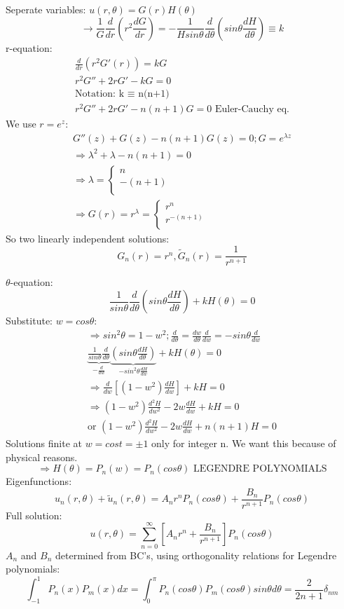 \documentclass[10pt,a4paper]{article}
\begin{document}
\begin{multicols}{2}
Seperate variables: $u(r,\theta)=G(r)H(\theta)$
\[\rightarrow \frac{1}{G}\frac{d}{dr}\left(r^{2}\frac{dG}{dr}\right)=-\frac{1}{Hsin\theta}\frac{d}{d\theta}\left(sin\theta\frac{dH}{d\theta}\right) \equiv k \]
r-equation:
\begin{align*}
    \frac{d}{dr}\left(r^{2}G'(r)\right)=kG \\
    r^{2}G'' + 2rG' -kG = 0 \\
    \text{Notation: k $\equiv$ n(n+1)} \\
    r^{2}G'' + 2rG' - n(n+1)G=0 \text{ Euler-Cauchy eq.}
\end{align*}
We use $r=e^{z}$:
\begin{align*}
    G''(z) + G(z) - n(n+1)G(z) = 0; G=e^{\lambda z}\\
    \Rightarrow \lambda^{2} + \lambda - n(n+1)=0 \\
    \Rightarrow \lambda=
    \begin{cases}
           n \\
           -(n+1) \\
    \end{cases} \\
    \Rightarrow G(r) = r^{\lambda} = 
    \begin{cases}
           r^{n} \\
           r^{-(n+1)}\\
    \end{cases}
\end{align*}
So two linearly independent solutions: 
\[G_{n}(r)=r^{n}, \widetilde G_{n}(r) = \frac{1}{r^{n+1}}\]

$\theta$-equation:
\[\frac{1}{sin\theta}\frac{d}{d\theta}\left(sin\theta\frac{dH}{d\theta}\right)+kH(\theta)=0\]
Substitute: $w=cos\theta$:
\begin{align*}
    \Rightarrow sin^{2}\theta = 1-w^{2}; \frac{d}{d\theta}=\frac{dw}{d\theta}\frac{d}{dw}=-sin\theta\frac{d}{dw} \\
    \underbrace{\frac{1}{sin\theta}\frac{d}{d\theta}}_{-\frac{d}{dw}}\underbrace{\left(sin\theta\frac{dH}{d\theta}\right)}_{-sin^{2}\theta\frac{dH}{dw}} + kH(\theta)=0 \\
    \Rightarrow \frac{d}{dw}\left[(1-w^{2})\frac{dH}{dw}\right]+kH=0 \\
    \Rightarrow \left(1-w^{2}\right)\frac{d^{2}H}{dw^{2}}-2w\frac{dH}{dw}+kH=0 \\
    \text{or } \left(1-w^{2}\right)\frac{d^{2}H}{dw^{2}}-2w\frac{dH}{dw}+n(n+1)H=0
\end{align*}
Solutions finite at $w=cost = \pm 1$ only for integer n. We want this because of physical reasons. \[\Rightarrow H(\theta) = P_{n}(w) = P_{n}(cos\theta) \text{ LEGENDRE POLYNOMIALS}\]
Eigenfunctions: \[u_{n}(r,\theta) + \widetilde u_{n}(r,\theta) = A_{n}r^{n}P_{n}(cos\theta)+\frac{B_{n}}{r^{n+1}}P_{n}(cos\theta)\]
Full solution: 
\[u(r,\theta) = \sum_{n=0}^{\infty}\left[A_{n}r^{n}+\frac{B_{n}}{r^{n+1}}\right]P_{n}(cos\theta)\]
$A_{n}$ and $B_{n}$ determined from BC's, using orthogonality relations for Legendre polynomials: 
\[\int_{-1}^{1}P_{n}(x)P_{m}(x)dx=\int_{0}^{\pi}P_{n}(cos\theta)P_{m}(cos\theta)sin\theta d\theta=\frac{2}{2n+1}\delta_{nm}\]


\end{multicols}
\end{document}
